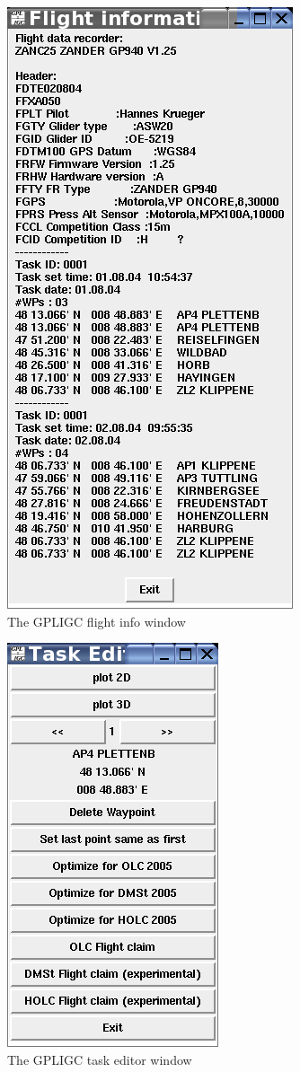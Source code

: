 \begin{figure}[h]
\caption{\label{flightinfo}The GPLIGC flight info window}
\begin{center}
\includegraphics{png/flightinfo}
\end{center}
\end{figure}


\begin{figure}[h]
\caption{\label{taskeditor}The GPLIGC task editor window}
\begin{center}
\includegraphics{png/taskeditor}
\end{center}
\end{figure}

